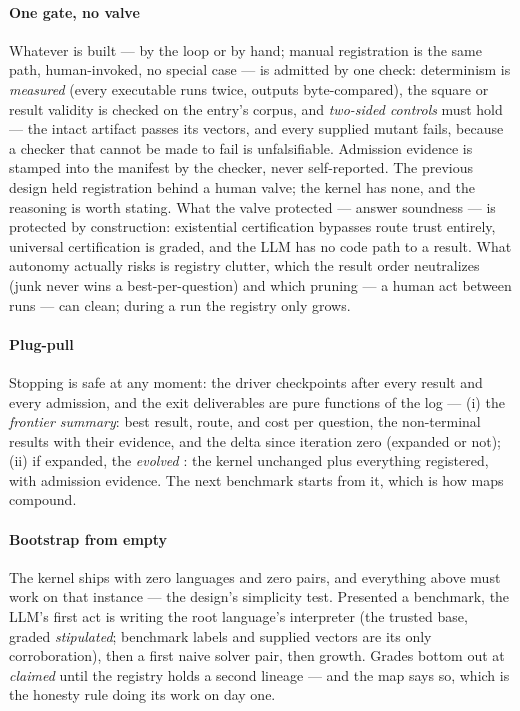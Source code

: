\paragraph{One gate, no valve}
Whatever is built --- by the loop or by hand; manual registration is
the same path, human-invoked, no special case --- is admitted by one
check: determinism is \emph{measured} (every executable runs twice,
outputs byte-compared), the square or result validity is checked on
the entry's corpus, and \emph{two-sided controls} must hold --- the
intact artifact passes its vectors, and every supplied mutant fails,
because a checker that cannot be made to fail is unfalsifiable.
Admission evidence is stamped into the manifest by the checker,
never self-reported. The previous design held registration behind a
human valve; the kernel has none, and the reasoning is worth
stating. What the valve protected --- answer soundness --- is
protected by construction: existential certification bypasses route
trust entirely, universal certification is graded, and the LLM has
no code path to a result. What autonomy actually risks is registry
clutter, which the result order neutralizes (junk never wins a
best-per-question) and which pruning --- a human act between runs
--- can clean; during a run the registry only grows.

\paragraph{Plug-pull}
Stopping is safe at any moment: the driver checkpoints after every
result and every admission, and the exit deliverables are pure
functions of the log --- (i) the \emph{frontier summary}: best
result, route, and cost per question, the non-terminal results with
their evidence, and the delta since iteration zero (expanded or
not); (ii) if expanded, the \emph{evolved} \hg{}: the kernel
unchanged plus everything registered, with admission evidence. The
next benchmark starts from it, which is how maps compound.

\paragraph{Bootstrap from empty}
The kernel ships with zero languages and zero pairs, and everything
above must work on that instance --- the design's simplicity test.
Presented a benchmark, the LLM's first act is writing the root
language's interpreter (the trusted base, graded \emph{stipulated};
benchmark labels and supplied vectors are its only corroboration),
then a first naive solver pair, then growth. Grades bottom out at
\emph{claimed} until the registry holds a second lineage --- and the
map says so, which is the honesty rule doing its work on day one.
